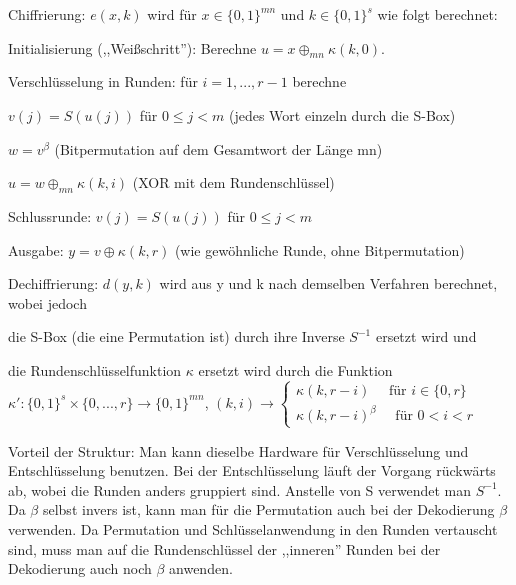 \documentclass[a4paper]{article}
\begin{document}
\begin{multicols}{3}
    Chiffrierung: $e(x,k)$ wird für $x\in\{0,1\}^{mn}$ und $k\in\{0,1\}^s$ wie folgt berechnet:
    \begin{enumerate*}
        \item Initialisierung (,,Weißschritt''): Berechne $u=x\oplus_{mn} \kappa (k,0)$.
        \item Verschlüsselung in Runden: für $i=1,...,r-1$ berechne
        \begin{enumerate*}
            \item $v(j)=S(u(j))$ für $0\leq j<m$ (jedes Wort einzeln durch die S-Box)
            \item $w=v^{\beta}$ (Bitpermutation auf dem Gesamtwort der Länge mn)
            \item $u=w\oplus_{mn} \kappa (k,i)$ (XOR mit dem Rundenschlüssel)
            \item Schlussrunde: $v(j)=S(u(j))$ für $0\leq j<m$
            \item Ausgabe: $y=v\oplus \kappa (k,r)$ (wie gewöhnliche Runde, ohne Bitpermutation)
        \end{enumerate*}
    \end{enumerate*}

    Dechiffrierung: $d(y,k)$ wird aus y und k nach demselben Verfahren berechnet, wobei jedoch
    \begin{enumerate*}
        \item die S-Box (die eine Permutation ist) durch ihre Inverse $S^{-1}$ ersetzt wird und
        \item die Rundenschlüsselfunktion $\kappa$ ersetzt wird durch die Funktion $\kappa':\{0,1\}^s\times\{0,...,r\}\rightarrow\{0,1\}^{mn}$, $(k,i)\rightarrow\begin{cases} \kappa (k,r-i)\quad\text{ für } i\in\{0,r\}\\ \kappa(k,r-i)^{\beta} \quad\text{ für } 0<i<r \end{cases}$
    \end{enumerate*}

    Vorteil der Struktur: Man kann dieselbe Hardware für Verschlüsselung und Entschlüsselung benutzen. Bei der Entschlüsselung läuft der Vorgang rückwärts ab, wobei die Runden anders gruppiert sind. Anstelle von S verwendet man $S^{-1}$. Da $\beta$ selbst invers ist, kann man für die Permutation auch bei der Dekodierung $\beta$ verwenden. Da Permutation und Schlüsselanwendung in den Runden vertauscht sind, muss man auf die Rundenschlüssel der ,,inneren'' Runden bei der Dekodierung auch noch $\beta$ anwenden.


\end{multicols}
\end{document}
